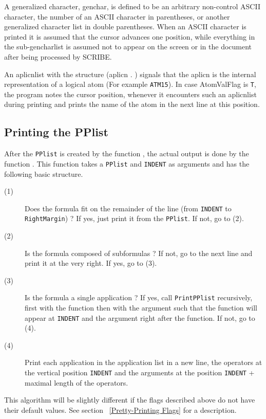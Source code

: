 A generalized character, genchar, is defined to be an arbitrary
non-control ASCII character, the number of an ASCII character in parentheses,
or another generalized character list in double parentheses.  When an ASCII
character is
printed it is assumed that the cursor advances one position, while
everything in the sub-gencharlist is assumed not to appear
on the screen or in the document after being processed by SCRIBE.

An aplicnlist with the structure (aplicn .  )
signals that the aplicn is the internal representation of a logical
atom (For example {\tt ATM15}).  In case AtomValFlag is {\tt T}, the program notes the
cursor position, whenever it encounters such an aplicnlist during
printing and prints the name of the atom in the next line at this
position.

\subsection{Printing the PPlist} 
After the {\tt PPlist} is created by the function , the actual
output is done by the function .  This function
takes a {\tt PPlist} and {\tt INDENT} as arguments and has the following
basic structure.

\begin{description}
\item [(1) ] Does the formula fit on the remainder of the line
(from {\tt INDENT} to {\tt RightMargin}) ?
If yes, just print it from the {\tt PPlist}.
If not, go to (2).

\item [(2) ] Is the formula composed of subformulas ?
If not, go to the next line and print it at the very right.
If yes, go to (3).

\item [(3) ] Is the formula a single application ?
If yes, call {\tt PrintPPlist} recursively, first with the function
then with the argument such that the function will appear at {\tt INDENT} and
the argument right after the function.
If not, go to (4).

\item [(4) ] Print each application in the application list in a new line,
the operators at the vertical position {\tt INDENT} and the
arguments at the position {\tt INDENT} + maximal length of the operators.
\end{description}

This algorithm will be slightly different if the flags described above
do not have their default values. See section ~\ref{Pretty-Printing Flags} for a description.

